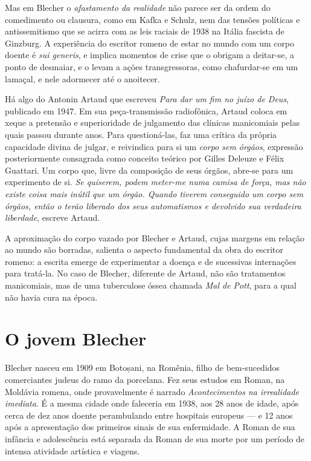 Mas em Blecher o \textit{afastamento da realidade} não parece ser da ordem do comedimento ou clausura, como em Kafka e Schulz, nem das tensões políticas e  antissemitismo que se acirra com as leis raciais de 1938 na Itália fascista de Ginzburg. A experiência do escritor romeno de estar no mundo com um corpo doente é \textit{sui generis}, e implica momentos de crise que o obrigam a deitar-se, a ponto de desmaiar, e o levam a ações transgressoras, como chafurdar-se em um lamaçal, e nele adormecer até o anoitecer.

Há algo do Antonin Artaud que escreveu \textit{Para dar um fim no juízo de Deus}, publicado em 1947. Em sua peça-transmissão radiofônica, Artaud coloca em xeque a pretensão e superioridade de julgamento das clínicas manicomiais pelas quais passou durante anos. Para questioná-las, faz uma crítica da própria capacidade divina de julgar, e reivindica para si um \textit{corpo sem órgãos}, expressão posteriormente consagrada como conceito teórico por Gilles Deleuze e Félix Guattari. Um corpo que, livre da composição de seus órgãos, abre-se para um experimento de si. \textit{Se quiserem, podem meter-me numa camisa de força, mas não existe coisa mais inútil que um órgão. Quando tiverem conseguido um corpo sem órgãos, então o terão liberado dos seus automatismos e devolvido sua verdadeira liberdade}, escreve Artaud.

A aproximação do corpo vazado por Blecher e Artaud, cujas margens em relação ao mundo são borradas, salienta o aspecto fundamental da obra do escritor romeno: a escrita emerge de experimentar a doença e de sucessivas internações para tratá-la. No caso de Blecher, diferente de Artaud, não são tratamentos manicomiais, mas de uma tuberculose óssea chamada \textit{Mal de Pott}, para a qual não havia cura na época.

\section{O jovem Blecher}

Blecher nasceu em 1909 em Botoșani, na Romênia, filho de bem-sucedidos comerciantes judeus do ramo da porcelana. Fez seus estudos em Roman, na Moldávia romena, onde provavelmente é narrado \textit{Acontecimentos na irrealidade imediata}. É a mesma cidade onde faleceria em 1938, aos 28 anos de idade, após cerca de dez anos doente perambulando entre hospitais europeus --- e 12 anos após a apresentação dos primeiros sinais de sua enfermidade. A Roman de sua infância e adolescência está separada da Roman de sua morte por um período de intensa atividade artística e viagens.

